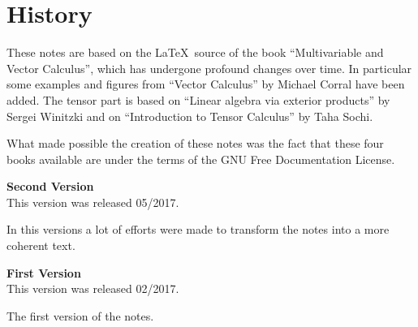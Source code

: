 \chapter*{History}
 \vspace{1cm}
 
 These notes are based on the \LaTeX\, source of the book ``Multivariable and Vector Calculus'', which has undergone profound changes over time. In particular some examples and figures from   ``Vector Calculus'' by Michael Corral have been added. 
 The tensor part is based on ``Linear algebra via exterior products'' by Sergei Winitzki and on ``Introduction to Tensor Calculus'' by Taha Sochi.

What made possible the creation of these notes was the fact that these four books available are  under the terms of the GNU Free Documentation License.


\textbf{Second  Version}\\
This version was released 05/2017.


In this versions a lot of efforts were made to transform the notes into a more coherent text.
 
\textbf{First Version}\\
This version was released 02/2017.

The  first version of the notes.  


